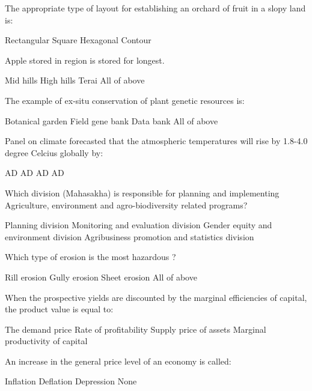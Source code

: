 \begin{questions}
\question The appropriate type of layout for establishing an orchard of fruit in a slopy land is:
  \begin{choices}
  \choice Rectangular
  \choice Square
  \choice Hexagonal
  \choice Contour
  \end{choices}

\question Apple stored in \fillin[][3cm] region is stored for longest.
  \begin{choices}
  \choice Mid hills
  \choice High hills
  \choice Terai
  \choice All of above
  \end{choices}

\question The example of ex-situ conservation of plant genetic resources is:
  \begin{choices}
  \choice Botanical garden
  \choice Field gene bank
  \choice Data bank
  \choice All of above
  \end{choices}

\question Panel on climate forecasted that the atmospheric temperatures will rise by 1.8-4.0 degree Celcius globally by:
  \begin{choices}
   AD
   AD
   AD
   AD
  \end{choices}

\question Which division (Mahasakha) is responsible for planning and implementing Agriculture, environment and agro-biodiversity related programs?
  \begin{choices}
  \choice Planning division
  \choice Monitoring and evaluation division
  \choice Gender equity and environment division
  \choice Agribusiness promotion and statistics division
  \end{choices}

\question Which type of erosion is the most hazardous ?
  \begin{choices}
  \choice Rill erosion
  \choice Gully erosion
  \choice Sheet erosion
  \choice All of above
  \end{choices}

\question When the prospective yields are discounted by the marginal efficiencies of capital, the product value is equal to:
  \begin{choices}
  \choice The demand price
  \choice Rate of profitability
  \choice Supply price of assets
  \choice Marginal productivity of capital
  \end{choices}

\question An increase in the general price level of an economy is called:
  \begin{choices}
  \choice Inflation
  \choice Deflation
  \choice Depression
  \choice None
  \end{choices}


\end{questions}
